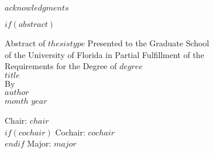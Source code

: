 \documentclass{ufdissertation}[overrideChapters] %
\begin{document}

{$acknowledgments$}              %



\realSingleSpace
  \tableofcontents %



\listoftables  %



\listoffigures %




$if(abstract)$
\newpage                         %
    \label{abstract}
        \begin{center}\realSingleSpace
            Abstract of $thesistype$ Presented to the Graduate School \\
            of the University of Florida in Partial Fulfillment of the \\
            Requirements for the Degree of $degree$\\[\baselineskip]
            {$title$}\\[\baselineskip] %
            By\\[\baselineskip]
            {$author$} \\[\baselineskip]
            {$month$} {$year$}\\[\baselineskip]
        \end{center}
    \realSingleSpace\vspace*{-\baselineskip}
            \hfill \break
                \noindent Chair: {$chair$} \\    %
                $if(cochair)$
                \noindent Cochair: {$cochair$} \\%
                $endif$
            \noindent Major: {$major$} \\
   \hphantom{forcing a space here} \\
   
\end{document}
